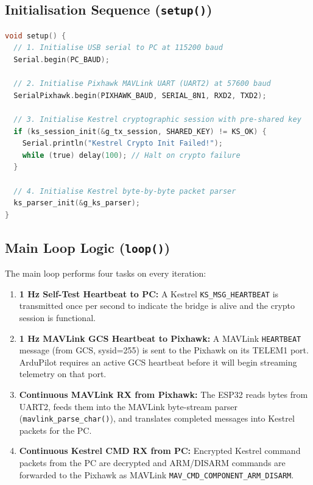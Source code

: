 \documentclass[11pt,a4paper]{article}
\begin{document}
\subsection{Initialisation Sequence (\texttt{setup()})}

\begin{lstlisting}[language=C, style=cstyle,
    caption={ESP32 Bridge Initialisation (setup())}]
void setup() {
  // 1. Initialise USB serial to PC at 115200 baud
  Serial.begin(PC_BAUD);

  // 2. Initialise Pixhawk MAVLink UART (UART2) at 57600 baud
  SerialPixhawk.begin(PIXHAWK_BAUD, SERIAL_8N1, RXD2, TXD2);

  // 3. Initialise Kestrel cryptographic session with pre-shared key
  if (ks_session_init(&g_tx_session, SHARED_KEY) != KS_OK) {
    Serial.println("Kestrel Crypto Init Failed!");
    while (true) delay(100); // Halt on crypto failure
  }

  // 4. Initialise Kestrel byte-by-byte packet parser
  ks_parser_init(&g_ks_parser);
}
\end{lstlisting}

\subsection{Main Loop Logic (\texttt{loop()})}

The main loop performs four tasks on every iteration:

\begin{enumerate}
    \item \textbf{1 Hz Self-Test Heartbeat to PC:} A Kestrel \texttt{KS\_MSG\_HEARTBEAT}
          is transmitted once per second to indicate the bridge is alive and the
          crypto session is functional.
    \item \textbf{1 Hz MAVLink GCS Heartbeat to Pixhawk:} A MAVLink
          \texttt{HEARTBEAT} message (from GCS, sysid=255) is sent to the Pixhawk
          on its TELEM1 port. ArduPilot requires an active GCS heartbeat before it
          will begin streaming telemetry on that port.
    \item \textbf{Continuous MAVLink RX from Pixhawk:} The ESP32 reads bytes
          from UART2, feeds them into the MAVLink byte-stream parser
          (\texttt{mavlink\_parse\_char()}), and translates completed messages into
          Kestrel packets for the PC.
    \item \textbf{Continuous Kestrel CMD RX from PC:} Encrypted Kestrel command
          packets from the PC are decrypted and ARM/DISARM commands are forwarded
          to the Pixhawk as MAVLink \texttt{MAV\_CMD\_COMPONENT\_ARM\_DISARM}.
\end{enumerate}
\end{document}
